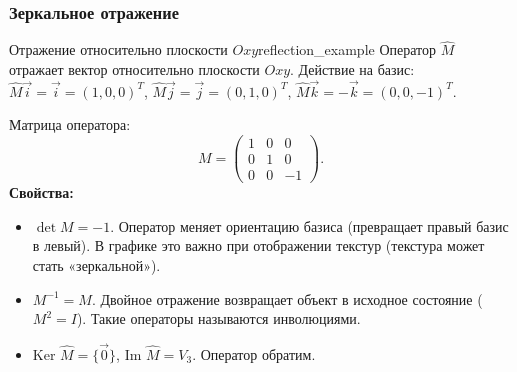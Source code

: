 \documentclass[12pt,a4paper]{article}
\begin{document}
\subsubsection*{Зеркальное отражение}

\begin{definition}{Отражение относительно плоскости $Oxy$}{reflection_example}
Оператор $\hat{M}$ отражает вектор относительно плоскости $Oxy$.
Действие на базис:
$\hat{M}\vec{i} = \vec{i} = (1,0,0)^T$,
$\hat{M}\vec{j} = \vec{j} = (0,1,0)^T$,
$\hat{M}\vec{k} = -\vec{k} = (0,0,-1)^T$.

Матрица оператора:
\[
M =
\begin{pmatrix} 1 & 0 & 0 \\ 0 & 1 & 0 \\ 0 & 0 & -1
\end{pmatrix}.
\]
\textbf{Свойства:}
\begin{itemize}
\item $\det M = -1$. Оператор меняет ориентацию базиса (превращает
правый базис в левый). В графике это важно при отображении текстур
(текстура может стать «зеркальной»).
\item $M^{-1} = M$. Двойное отражение возвращает объект в исходное
состояние ($M^2 = I$). Такие операторы называются инволюциями.
\item $\text{Ker } \hat{M} = \{\vec{0}\}$, $\text{Im } \hat{M} =
V_3$. Оператор обратим.
\end{itemize}
\end{definition}
\end{document}
